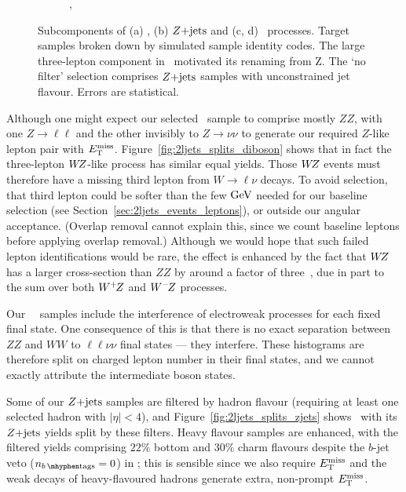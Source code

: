 \begin{figure}[tp]
\begin{subfigure}{0.48\textwidth}
\caption{\srllbb, \topother}
\label{fig:2ljets_splits_topother2}
\end{subfigure}
\caption[
Subcomponents of \diboson, $\zjets$ and rare-top processes.
]{%
Subcomponents of (a) \diboson, (b) $\zjets$ and (c, d) \topother\ processes.
Target samples broken down by simulated sample identity codes.
The large three-lepton component in \crvz\ motivated its renaming from \crz Z.
The `no filter' selection comprises $\zjets$ samples with unconstrained jet
flavour.
Errors are statistical.
}
\label{fig:2ljets_splits}
\end{figure}

Although one might expect our selected \diboson\ sample to comprise mostly
$ZZ$, with one $Z\to \ell\ell$ and the other invisibly to
$Z\to \nu\nu$ to generate our required $Z$-like lepton pair with
$\met$.
Figure~\ref{fig:2ljets_splits_diboson} shows that in fact the three-lepton
$W\kern-0.4exZ$-like process has similar equal yields.
Those $W\kern-0.4exZ$ events must therefore have a missing third lepton from
$W\to \ell\nu$ decays.
To avoid selection, that third lepton could be softer than the few $\eV[G]$
needed for our baseline selection
(see Section~\ref{sec:2ljets_events_leptons}),
or outside our angular acceptance.
(Overlap removal cannot explain this, since we count baseline leptons before
applying overlap removal.)
Although we would hope that such failed lepton identifications would be rare,
the effect is enhanced by the fact that $W\kern-0.4exZ$ has a larger
cross-section than $ZZ$ by around a factor of three~\cite{Campbell:2011bn},
due in part to the sum over both $W^+\kern-0.4exZ$ and $W^-\kern-0.4exZ$
processes.

Our \sherpa\ \diboson\ samples include the interference of electroweak
processes for each fixed final state.
One consequence of this is that there is no exact separation between $ZZ$ and
$WW$ to $\ell\ell\nu\nu$ final states --- they interfere.
These histograms are therefore split on charged lepton number in their
final states, and we cannot exactly attribute the intermediate boson states.

Some of our $\zjets$ samples are filtered by hadron flavour
(requiring at least one selected hadron with $|\eta| < 4$), and
Figure~\ref{fig:2ljets_splits_zjets} shows \crz\ with its $\zjets$ yields
split by these filters.
Heavy flavour samples are enhanced, with the filtered yields comprising
$22\%$ bottom and $30\%$ charm flavours despite the $b$-jet veto ($\nbtag = 0$)
in \crz;
this is sensible since we also require $\met$ and the weak decays of
heavy-flavoured hadrons generate extra, non-prompt $\met$.

